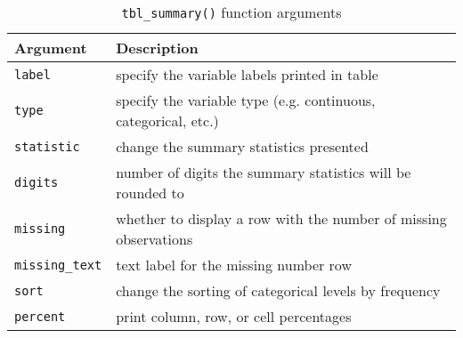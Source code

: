 \captionsetup[table]{labelformat=empty,skip=1pt}
\begin{longtable}{ll}
\caption{\label{tab:}\texttt{tbl\_summary()} function arguments}\\
\toprule
Argument & Description \\ 
\midrule
\texttt{label} & specify the variable labels printed in table \\ 
\texttt{type} & specify the variable type (e.g. continuous, categorical, etc.) \\ 
\texttt{statistic} & change the summary statistics presented \\ 
\texttt{digits} & number of digits the summary statistics will be rounded to \\ 
\texttt{missing} & whether to display a row with the number of missing observations \\ 
\texttt{missing\_text} & text label for the missing number row \\ 
\texttt{sort} & change the sorting of categorical levels by frequency \\ 
\texttt{percent} & print column, row, or cell percentages \\ 
\bottomrule
\end{longtable}

